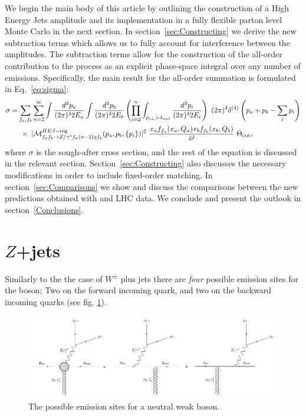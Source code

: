 	We begin the main body of this article by outlining the construction of a
	High Energy Jets amplitude and its implementation in a fully flexible parton
	level Monte Carlo in the next section.  In section~\ref{sec:Constructing} we
	derive the new subtraction terms which allows us to fully account for
	interference between the amplitudes. The subtraction terms allow for the
	construction of the all-order contribution to the process as an explicit
	phase-space integral over any number of emissions. Specifically, the
	main result for the all-order summation is formulated in
	Eq.~\eqref{eq:sigma}:
	\begin{align}
	  \nonumber
	  \begin{split}
	    \sigma =& \sum_{f_a,f_b} \sum_{n=2}^\infty \int \frac{d^3 p_a}{(2\pi)^3 2E_a} \int \frac{d^3
	      p_b}{(2\pi)^3 2E_b}  \left( \prod_{i=2}^n \int_{p_{i\perp}>\lambda_{cut}} \frac{d^3 p_i}{(2\pi)^3
	        2E_i} \right)\ (2\pi)^4 \delta^{(4)}\left(p_a+p_b - \sum_i p_i\right) \\
	    & \ \times \ |\mathcal{M}^{HEJ-{\rm reg}}_{f_af_b\to Z/\gamma^*
	      f_a(n-2)gf_b}(p_a,p_b,\{p_i\})|^2 \ \frac{ x_a f_{f_a}(x_a, Q_a) x_b
	      f_{f_b}(x_b,Q_b)}{\hat s^2}\ \Theta_{\rm cut},
	  \end{split}
	\end{align}
	where $\sigma$ is the sough-after cross
	section, and the rest of the equation is discussed in the relevant section. Section~\ref{sec:Constructing} also discusses the necessary
	modifications in order to include fixed-order matching. In
	section~\ref{sec:Comparisons} we show and discuss the comparisons between the new
	predictions obtained with \hej and LHC data. We conclude and present the
	outlook in section~\ref{Conclusions}.

\section{$Z$+jets}
	\label{sec:Zcurrents}

	Similarly to the the case of $W^\pm$ plus jets there are \emph{four} possible
	emission sites for the boson; Two on the forward incoming quark, and two on the
	backward incoming quarks (see fig. \ref{fig:emissionsites}).

	\begin{figure}[h]
	\includegraphics[width=0.98\linewidth]{figures/EmissionSites.pdf}
	\caption{The possible emission sites for a neutral weak boson.}
	\label{fig:emissionsites}
	\end{figure}

